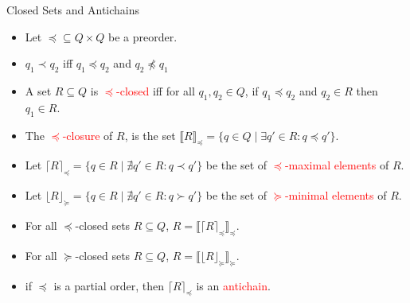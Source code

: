 \documentclass[12pt]{beamer}
\begin{document}
\begin{frame}{Closed Sets and Antichains}
	\begin{itemize}
		\item Let $\preceq \subseteq Q \times Q$ be a preorder.
		\item $q_{1} \prec q_{2}$ iff $q_{1} \preceq q_{2}$ and $q_{2} \npreceq q_{1}$
		\item A set $R \subseteq Q$ is \textcolor{red}{$\preceq$-closed} iff for all $q_{1}, q_{2} \in Q$, if $q_{1} \preceq q_{2}$ and $q_{2} \in R$ then $q_{1} \in R$.
		\item The \textcolor{red}{$\preceq$-closure} of $R$, is the set $\llbracket R \rrbracket_{\preceq} = \{q \in Q \mid \exists q' \in R : q \preceq q'\}$.
		\item Let $\lceil R \rceil_{\preceq} = \{q \in R \mid \nexists q' \in R : q \prec q'\}$ be the set of \textcolor{red}{$\preceq$-maximal elements} of $R$.
		\item Let $\lfloor R \rfloor_{\succeq} = \{q \in R \mid \nexists q' \in R : q \succ q'\}$ be the set of \textcolor{red}{$\succeq$-minimal elements} of $R$.
		\item For all $\preceq$-closed sets $R \subseteq Q$, $R = \llbracket \lceil R \rceil_{\preceq} \rrbracket_{\preceq}$.
		\item For all $\succeq$-closed sets $R \subseteq Q$, $R = \llbracket \lfloor R \rfloor_{\succeq} \rrbracket_{\succeq}$.
		\item if $\preceq$ is a partial order, then $\lceil R \rceil_{\preceq}$ is an \textcolor{red}{antichain}.
	\end{itemize}
\end{frame}
\end{document}
